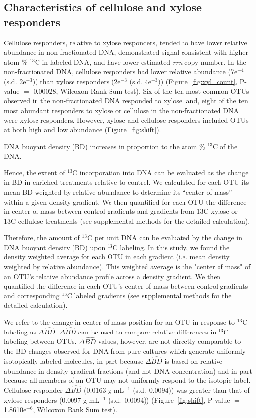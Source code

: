 \subsection{Characteristics of cellulose and xylose responders}
Cellulose responders, relative to xylose responders, tended to have lower
relative abundance in non-fractionated DNA, demonstrated signal consistent with
higher atom \% $^{13}$C in labeled DNA, and have lower estimated \textit{rrn} copy number. In the
non-fractionated DNA, cellulose responders had lower relative abundance
(7e$^{-4}$ (s.d. 2e$^{-3}$)) than xylose responders (2e$^{-3}$ (s.d.
4e$^{-3}$)) (Figure~\ref{fig:xyl_count}, P-value $=$ 0.00028, Wilcoxon Rank Sum
test). Six of the ten most common OTUs observed in the non-fractionated DNA
responded to xylose, and, eight of the ten most abundant responders to xylose
or cellulose in the non-fractionated DNA were xylose responders. However,
xylose and cellulose responders included OTUs at both high and low abundance
(Figure~\ref{fig:shift}).

DNA buoyant density (BD) increases in proportion to the atom \% $^{13}$C of the
DNA.

Hence, the extent of $^{13}$C incorporation into DNA can be evaluated as the
change in BD in enriched treatments relative to control. We calculated for each
OTU its mean BD weighted by relative abundance to determine its “center of
mass” within a given density gradient. We then quantified for each OTU the
difference in center of mass between control gradients and gradients from
13C-xylose or 13C-cellulose treatments (see supplemental methods for the
detailed calculation). 

Therefore, the amount of $^{13}$C per unit DNA can be evaluated by the change
in DNA buoyant density (BD) upon $^{13}$C labeling. In this study, we found the
density weighted average for each OTU in each gradient (i.e. mean density
weighted by relative abundance). This weighted average is the "center of mass"
of an OTU's relative abundance profile across a density gradient. We then
quantified the difference in each OTU's center of mass between control
gradients and corresponding $^{13}$C labeled gradients (see supplemental
methods for the detailed calculation). 

We refer to the change in center of mass position for an OTU in response to
$^{13}$C labeling as $\Delta\hat{BD}$. $\Delta\hat{BD}$ can be used to compare
relative differences in $^{13}$C labeling between OTUs. $\Delta\hat{BD}$
values, however, are not directly comparable to the BD changes observed for DNA
from pure cultures which generate uniformly isotopically labeled molecules, in
part because $\Delta\hat{BD}$ is based on relative abundance in density
gradient fractions (and not DNA concentration) and in part because all members
of an OTU may not uniformly respond to the isotopic label. Cellulose responder
$\Delta\hat{BD}$ (0.0163 g mL$^{-1}$ (s.d.~0.0094)) was greater than that of
xylose responders (0.0097 g mL$^{-1}$ (s.d.~0.0094)) (Figure~\ref{fig:shift},
P-value $=$ 1.8610e$^{-6}$, Wilcoxon Rank Sum test). 

